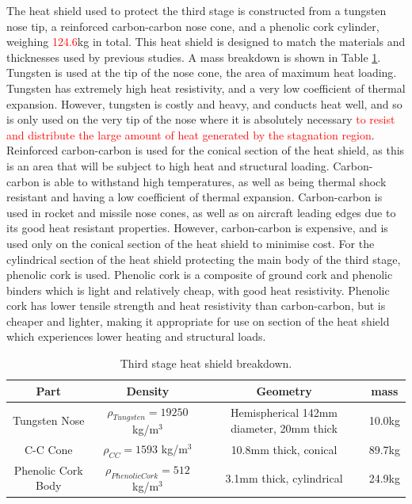 The heat shield used to protect the third stage is constructed from a tungsten nose tip, a reinforced carbon-carbon nose cone, and a phenolic cork cylinder, weighing \textcolor{red}{124.6}kg in total. This heat shield is designed to match the materials and thicknesses used by previous studies\cite{Preller2017b}. A mass breakdown is shown in Table \ref{tab:heatshield}.
Tungsten is used at the tip of the nose cone, the area of maximum heat loading. Tungsten has extremely high heat resistivity, and a very low coefficient of thermal expansion\cite{tungsten}. However, tungsten is costly and heavy, and conducts heat well, and so is only used on the very tip of the nose where it is absolutely necessary \textcolor{red}{to resist and distribute the large amount of heat generated by the stagnation region}. 
  Reinforced carbon-carbon is used for the conical section of the heat shield, as this is an area that will be subject to high heat and structural loading. Carbon-carbon is able to withstand high temperatures, as well as being thermal shock resistant and having a low coefficient of thermal expansion\cite{Fitzer}. Carbon-carbon is used in rocket and missile nose cones, as well as on aircraft leading edges due to its good heat resistant properties\cite{Fitzer}. However, carbon-carbon is expensive, and is used only on the conical section of the heat shield to minimise cost. For the cylindrical section of the heat shield protecting the main body of the third stage, phenolic cork is used. Phenolic cork is a composite of ground cork and phenolic binders which is light and relatively cheap, with good heat resistivity. Phenolic cork has lower tensile strength and heat resistivity than carbon-carbon\cite{Composites,Fitzer}, but is cheaper and lighter, making it appropriate for use on section of the heat shield which experiences lower heating and structural loads. 

		\begin{table}[h]
			\centering
\begin{tabular}{|c|c|c|c|}
	\hline  Part & Density & Geometry & mass \\ 
	\hline  Tungsten Nose & $\rho_{Tungsten} = 19250$  kg/m$^3$ & Hemispherical 142mm diameter, 20mm thick & 10.0kg \\ 
		\hline C-C Cone & $\rho_{CC} = 1593$  kg/m$^3$ & 10.8mm thick, conical & 89.7kg \\ 
			\hline Phenolic Cork Body & $\rho_{Phenolic Cork} = 512$  kg/m$^3$ & 3.1mm thick, cylindrical & 24.9kg \\ 
	\hline 
\end{tabular} 
\caption{Third stage heat shield breakdown.} %
\label{tab:heatshield}
\end{table}
		
